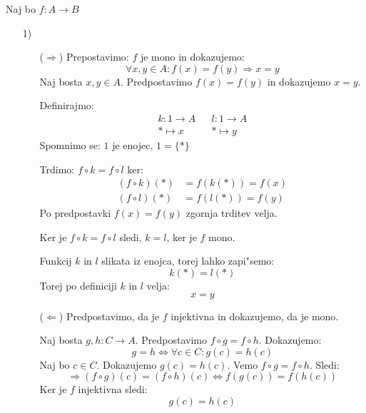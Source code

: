 Naj bo $f: A \to B$
\begin{enumerate}
	\item[1)] 
	\begin{itemize}
		\item[($\Rightarrow$)] Prepostavimo: $f$ je mono in dokazujemo:
		\begin{equation*}
		\forall x, y \in A: f(x) = f(y) \Rightarrow x = y
		\end{equation*}
		Naj bosta $x, y \in A$. Predpostavimo $f(x) = f(y)$ in dokazujemo $x = y$.
		
		Definirajmo:
		\begin{align*}
		k: 1 \to A && l: 1 \to A \\
		* \mapsto x && * \mapsto y
		\end{align*}
		Spomnimo se: $1$ je enojec, $1 = \{*\}$
		
		Trdimo: $f \circ k = f \circ l$ ker:
		\begin{align*}
		(f \circ k)(*) &= f(k(*)) = f(x) \\
		(f \circ l)(*) &= f(l(*)) = f(y)
		\end{align*}
		Po predpostavki $f(x) = f(y)$ zgornja trditev velja.
		
		Ker je $f \circ k = f \circ l$ sledi, $k = l$, ker je $f$ mono.
		
		Funkcij $k$ in $l$ slikata iz enojca, torej lahko zapi"semo:
		\begin{equation*}
		k(*) = l(*)
		\end{equation*}
		Torej po definiciji $k$ in $l$ velja:
		\begin{equation*}
		x = y
		\end{equation*}
		
		\item[($\Leftarrow$)] Predpostavimo, da je $f$ injektivna in dokazujemo, da je mono.
		
		Naj bosta $g, h: C \to A$. Predpostavimo $f\circ g = f\circ h$. Dokazujemo:
		\begin{equation*}
		g =h \iff \forall c \in C: g(c) = h(c)
		\end{equation*}
		Naj bo $c \in C$. Dokazujemo $g(c) = h(c)$. Vemo $f \circ g = f \circ h$. Sledi:
		\begin{equation*}
			\Rightarrow (f\circ g)(c) = (f\circ h)(c) \iff f(g(c)) = f(h(c))
		\end{equation*}
		Ker je $f$ injektivna sledi:
		\begin{equation*}
		g(c) = h(c)
		\end{equation*}
	\end{itemize}
\end{enumerate}

